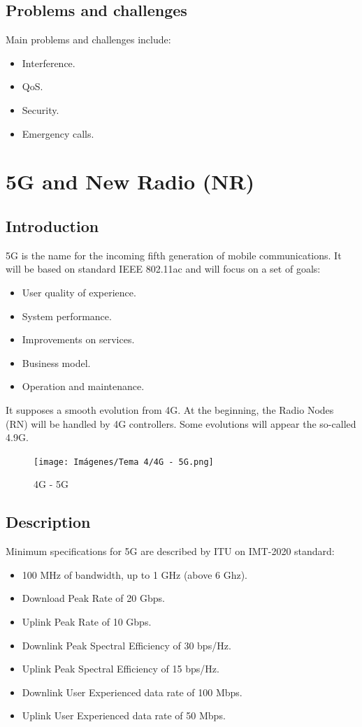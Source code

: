 \documentclass[
	12pt,
	twoside
]{book}
\begin{document}
\subsection{Problems and challenges}

Main problems and challenges include:
\begin{itemize}
	\item Interference.
	\item QoS.
	\item Security.
	\item Emergency calls.
\end{itemize}

\section{5G and New Radio (NR)}

\subsection{Introduction}

5G is the name for the incoming fifth generation of mobile communications. It will be based on standard IEEE 802.11ac and will focus on a set of goals:
\begin{itemize}
	\item User quality of experience.
	\item System performance.
	\item Improvements on services.
	\item Business model.
	\item Operation and maintenance.
\end{itemize}

It supposes a smooth evolution from 4G. At the beginning, the Radio Nodes (RN) will be handled by 4G controllers. Some evolutions will appear the so-called 4.9G.

\begin{figure}[H]
	\centering
	\texttt{[image: Imágenes/Tema 4/4G - 5G.png]}
	\caption{
		\label{fig:unit4_4G_5G}
		4G - 5G
	}
\end{figure}

\subsection{Description}

Minimum specifications for 5G are described by ITU on IMT-2020 standard:
\begin{itemize}
	\item 100 MHz of bandwidth, up to 1 GHz (above 6 Ghz).
	\item Download Peak Rate of 20 Gbps.
	\item Uplink Peak Rate of 10 Gbps.
	\item Downlink Peak Spectral Efficiency of 30 bps/Hz.
	\item Uplink Peak Spectral Efficiency of 15 bps/Hz.
	\item Downlink User Experienced data rate of 100 Mbps.
	\item Uplink User Experienced data rate of 50 Mbps.
\end{itemize}
\end{document}
